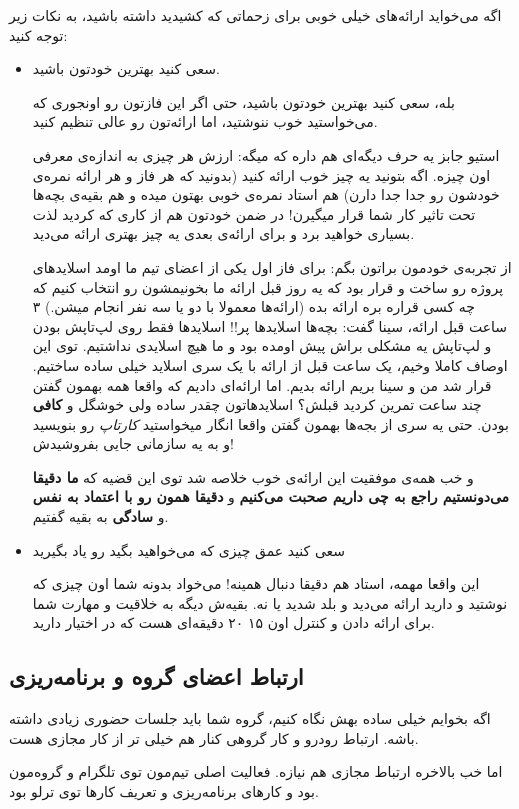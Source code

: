 اگه می‌خواید ارائه‌های خیلی خوبی برای زحماتی که کشیدید داشته باشید، به نکات زیر توجه کنید:
\begin{itemize}
	\item 
	{\large سعی کنید بهترین خودتون باشید.}
	
	بله، سعی کنید بهترین خودتون باشید، حتی اگر این فازتون رو اونجوری که می‌خواستید خوب ننوشتید،  اما ارائه‌تون رو عالی تنظیم کنید.
	
	استیو جابز یه حرف دیگه‌ای هم داره که میگه: ارزش هر چیزی به اندازه‌ی معرفی اون چیزه. اگه بتونید یه چیز خوب ارائه کنید (بدونید که هر فاز و هر ارائه نمره‌ی خودشون رو جدا جدا دارن) هم استاد نمره‌ی خوبی بهتون میده و هم بقیه‌ی بچه‌ها تحت تاثیر کار شما قرار میگیرن! در ضمن خودتون هم از کاری که کردید لذت بسیاری خواهید برد و برای ارائه‌ی بعدی یه چیز بهتری ارائه می‌دید.
	
	از تجربه‌ی خودمون براتون بگم: برای فاز اول یکی از اعضای تیم ما اومد اسلاید‌های پروژه رو ساخت و قرار بود که یه روز قبل ارائه ما بخونیمشون رو انتخاب کنیم که چه کسی قراره بره ارائه بده (ارائه‌‌ها معمولا با دو یا سه نفر انجام میشن.) ۳ ساعت قبل ارائه، سینا گفت: بچه‌ها اسلاید‌ها پر!! اسلاید‌ها فقط روی لپ‌تاپش بودن و لپ‌تاپش یه مشکلی براش پیش اومده بود و ما هیچ اسلایدی نداشتیم.
	توی این اوصاف کاملا وخیم، یک ساعت قبل از ارائه با 
	یک سری اسلاید خیلی ساده ساختیم.
	قرار شد من و سینا بریم ارائه بدیم. اما ارائه‌ای دادیم که واقعا همه بهمون گفتن چند ساعت تمرین کردید قبلش؟ اسلاید‌هاتون چقدر ساده ولی خوشگل و \textbf{کافی} بودن.
	حتی یه سری از بجه‌ها بهمون گفتن واقعا انگار میخواستید \textit{کارتاپ} رو بنویسید و به یه سازمانی جایی بفروشیدش!
	
	و خب همه‌ی موفقیت این ارائه‌ی خوب خلاصه شد توی این قضیه که \textbf{ما دقیقا می‌دونستیم راجع به چی داریم صحبت می‌کنیم} و \textbf{دقیقا همون رو با اعتماد به نفس} و \textbf{سادگی} به بقیه گفتیم.
	
	\item 
	{\large سعی کنید عمق چیزی که می‌خواهید بگید رو یاد بگیرید}
	
	این واقعا مهمه، استاد هم دقیقا دنبال همینه! می‌خواد بدونه شما اون چیزی که نوشتید و دارید ارائه می‌دید و بلد شدید یا نه. بقیه‌ش دیگه به خلاقیت و مهارت شما برای ارائه دادن و کنترل اون ۱۵ ۲۰ دقیقه‌ای هست که در اختیار دارید.
	
\end{itemize}

\subsection{ارتباط اعضای گروه و برنامه‌ریزی}
اگه بخوایم خیلی ساده بهش نگاه کنیم، گروه شما باید جلسات حضوری زیادی داشته باشه. ارتباط رودرو و کار گروهی کنار هم خیلی ‌تر از کار مجازی‌ هست.

اما خب بالاخره ارتباط مجازی هم نیازه. فعالیت اصلی تیم‌مون توی تلگرام و گروه‌مون بود و کار‌های برنامه‌ریزی و تعریف کارها توی ترلو بود.